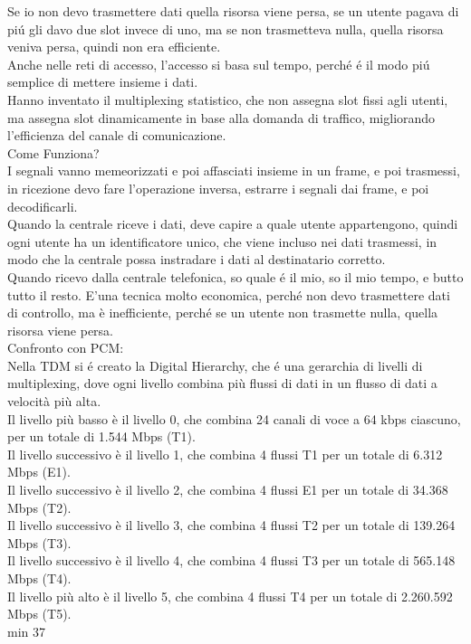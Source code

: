 Se io non devo trasmettere dati quella risorsa viene persa, se un utente pagava di piú gli davo due slot
invece di uno, ma se non trasmetteva nulla, quella risorsa veniva persa, quindi non era efficiente.\\
Anche nelle reti di accesso, l'accesso si basa sul tempo, perché é il modo piú semplice 
di mettere insieme i dati.\\

Hanno inventato il multiplexing statistico, che non assegna slot fissi agli utenti, ma assegna slot 
dinamicamente in base alla domanda di traffico, migliorando l'efficienza del canale di comunicazione.\\

Come Funziona?\\
I segnali vanno memeorizzati e poi affasciati insieme in un frame, e poi trasmessi, in ricezione devo 
fare l'operazione inversa, estrarre i segnali dai frame, e poi decodificarli.\\

Quando la centrale riceve i dati, deve capire a quale utente appartengono, quindi ogni utente ha un identificatore unico,
che viene incluso nei dati trasmessi, in modo che la centrale possa instradare i dati al destinatario corretto.\\

Quando ricevo dalla centrale telefonica, so quale é il mio, so il mio tempo, e butto tutto il resto. 
E'una tecnica molto economica, perché non devo trasmettere dati di controllo, ma è inefficiente, 
perché se un utente non trasmette nulla, quella risorsa viene persa.\\

Confronto con PCM: \\
Nella TDM si é creato la Digital Hierarchy, che é una gerarchia di livelli di multiplexing, 
dove ogni livello combina più flussi di dati in un flusso di dati a velocità più alta.\\
Il livello più basso è il livello 0, che combina 24 canali di voce a 64 kbps ciascuno, per un totale di 1.544 Mbps (T1).\\
Il livello successivo è il livello 1, che combina 4 flussi T1 per un totale di 6.312 Mbps (E1).\\
Il livello successivo è il livello 2, che combina 4 flussi E1 per un totale di 34.368 Mbps (T2).\\
Il livello successivo è il livello 3, che combina 4 flussi T2 per un totale di 139.264 Mbps (T3).\\
Il livello successivo è il livello 4, che combina 4 flussi T3 per un totale di 565.148 Mbps (T4).\\
Il livello più alto è il livello 5, che combina 4 flussi T4 per un totale di 2.260.592 Mbps (T5).\\
 min 37


